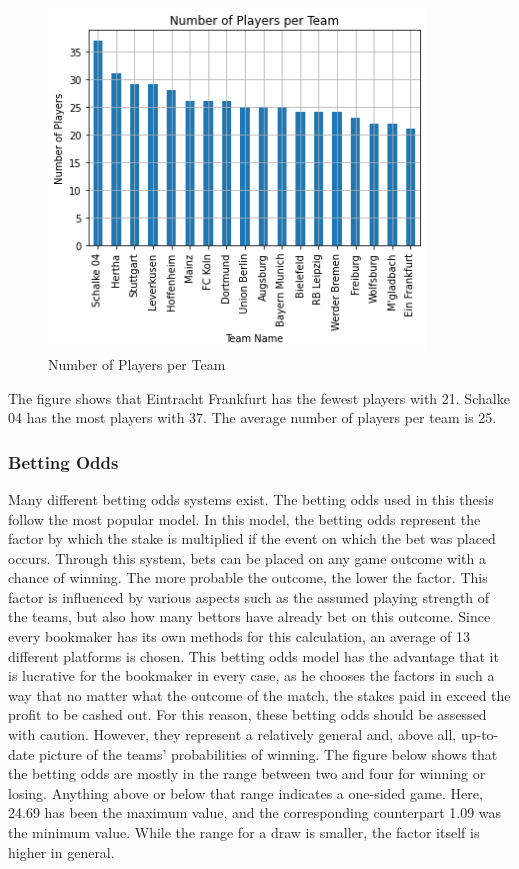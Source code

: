 \begin{figure}[H]
    \centering
    \label{fig:numer_of_players_per_team}
    \includegraphics[width=10cm]{chapter/4_implementation/section/2_data/section/figures/number_of_players_per_team.png}
    \captionsetup{justification=centering}
    \caption{Number of Players per Team}
\end{figure}

The figure shows that Eintracht Frankfurt has the fewest players with 21. Schalke 04 has the most players with 37. The average number of players per team is 25.

\subsubsection{Betting Odds}

Many different betting odds systems exist. The betting odds used in this thesis follow the most popular model. In this model, the betting odds represent the factor by which the stake is multiplied if the event on which the bet was placed occurs. Through this system, bets can be placed on any game outcome with a chance of winning. The more probable the outcome, the lower the factor. This factor is influenced by various aspects such as the assumed playing strength of the teams, but also how many bettors have already bet on this outcome. Since every bookmaker has its own methods for this calculation, an average of 13 different platforms is chosen. This betting odds model has the advantage that it is lucrative for the bookmaker in every case, as he chooses the factors in such a way that no matter what the outcome of the match, the stakes paid in exceed the profit to be cashed out. For this reason, these betting odds should be assessed with caution. However, they represent a relatively general and, above all, up-to-date picture of the teams' probabilities of winning. The figure below shows that the betting odds are mostly in the range between two and four for winning or losing. Anything above or below that range indicates a one-sided game. Here, 24.69 has been the maximum value, and the corresponding counterpart 1.09 was the minimum value. While the range for a draw is smaller, the factor itself is higher in general.

